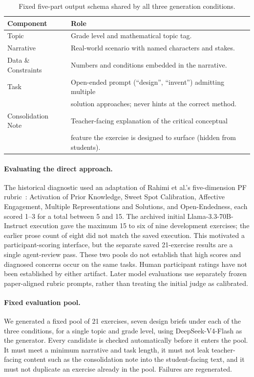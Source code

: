 \begin{table}[h]
\centering
\small
\begin{tabular}{@{}ll@{}}
\toprule
\textbf{Component} & \textbf{Role} \\
\midrule
Topic & Grade level and mathematical topic tag. \\
Narrative & Real-world scenario with named characters and stakes. \\
Data \& Constraints & Numbers and conditions embedded in the narrative. \\
Task & Open-ended prompt (``design'', ``invent'') admitting multiple \\
 & solution approaches; never hints at the correct method. \\
Consolidation Note & Teacher-facing explanation of the critical conceptual \\
 & feature the exercise is designed to surface (hidden from students). \\
\bottomrule
\end{tabular}
\caption{Fixed five-part output schema shared by all three generation conditions.}
\label{tab:output-schema}
\end{table}

\paragraph{Evaluating the direct approach.} The historical diagnostic used an adaptation of Rahimi et al.'s five-dimension PF rubric~\cite{rahimi2025}: Activation of Prior Knowledge, Sweet Spot Calibration, Affective Engagement, Multiple Representations and Solutions, and Open-Endedness, each scored 1--3 for a total between 5 and 15. The archived initial Llama-3.3-70B-Instruct execution gave the maximum 15 to six of nine development exercises; the earlier prose count of eight did not match the saved execution. This motivated a participant-scoring interface, but the separate saved 21-exercise results are a single agent-review pass. These two pools do not establish that high scores and diagnosed concerns occur on the same tasks. Human participant ratings have not been established by either artifact. Later model evaluations use separately frozen paper-aligned rubric prompts, rather than treating the initial judge as calibrated.

\paragraph{Fixed evaluation pool.} We generated a fixed pool of 21 exercises, seven design briefs under each of the three conditions, for a single topic and grade level, using DeepSeek-V4-Flash as the generator. Every candidate is checked automatically before it enters the pool. It must meet a minimum narrative and task length, it must not leak teacher-facing content such as the consolidation note into the student-facing text, and it must not duplicate an exercise already in the pool. Failures are regenerated.


